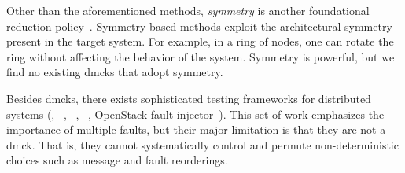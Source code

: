 Other than the aforementioned methods, {\em symmetry} is another
foundational reduction policy~\cite{Emerson+97-PorAndSym,
  Prasad+00-SymBasedMc}.  Symmetry-based methods exploit the
architectural symmetry present in the target system.  For example, in
a ring of nodes, one can rotate the ring without affecting
the behavior of the system.  Symmetry is powerful, but
we find no existing dmcks that adopt symmetry.

Besides dmcks, there exists sophisticated testing frameworks for
distributed systems (\eg, \fate~\cite{Gunawi+11-FateDestini},
\prefail~\cite{Joshi+11-PreFail},
\setsudo~\cite{Joshi+13-SetsudoTesting}, OpenStack
fault-injector~\cite{Ju+13-FaultResOpenStack}). This set of work
emphasizes the importance of multiple faults, but their major
limitation is that they are not a dmck.  That is, they cannot
systematically control and permute non-deterministic choices such as
message and fault reorderings.

\fi
